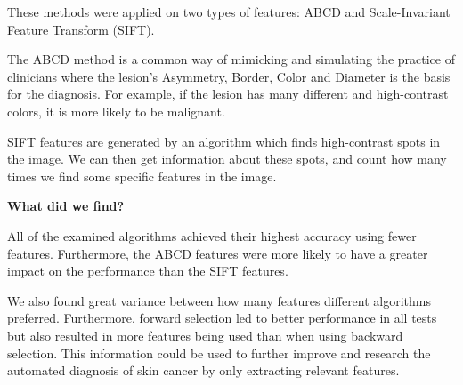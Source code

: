 \documentclass{article}
\begin{document}
These methods were applied on two types of features: ABCD and Scale-Invariant Feature Transform (SIFT).

The ABCD method is a common way of mimicking and simulating the practice of clinicians where the lesion’s Asymmetry, Border, Color and Diameter is the basis for the diagnosis. For example, if the lesion has many different and high-contrast colors, it is more likely to be malignant.

SIFT features are generated by an algorithm which finds high-contrast spots in the image. We can then get information about these spots, and count how many times we find some specific features in the image.
\vspace*{4px}

\noindent\textbf{What did we find?}

All of the examined algorithms achieved their highest accuracy using fewer features. Furthermore, the ABCD features were more likely to have a greater impact on the performance than the SIFT features. 

We also found great variance between how many features different algorithms preferred. Furthermore, forward selection led to better performance in all tests but also resulted in more features being used than when using backward selection. This information could be used to further improve and research the automated diagnosis of skin cancer by only extracting relevant features.
\end{document}
